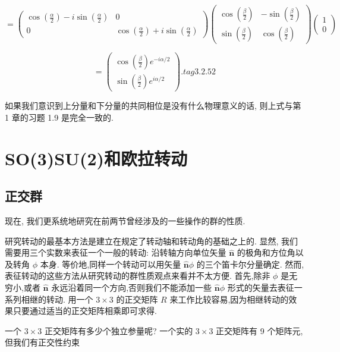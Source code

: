 $$
= \left( \begin{matrix} \cos \left( \frac{\alpha }{2}\right) - i\sin \left( \frac{\alpha }{2}\right) & 0 \\ 0 & \cos \left( \frac{\alpha }{2}\right) + i\sin \left( \frac{\alpha }{2}\right) \end{matrix}\right) \left( \begin{matrix} \cos \left( \frac{\beta }{2}\right) & - \sin \left( \frac{\beta }{2}\right) \\ \sin \left( \frac{\beta }{2}\right) & \cos \left( \frac{\beta }{2}\right) \end{matrix}\right) \left( \begin{array}{l} 1 \\ 0 \end{array}\right)
$$

$$
= \left( \begin{array}{l} \cos \left( \frac{\beta }{2}\right) {e}^{-{i\alpha }/2} \\ \sin \left( \frac{\beta }{2}\right) {e}^{{i\alpha }/2} \end{array}\right) . tag{3. 2.52}
$$

如果我们意识到上分量和下分量的共同相位是没有什么物理意义的话, 则上式与第 1 章的习题 1.9 是完全一致的.

\section{SO(3)SU(2)和欧拉转动}
\subsection{正交群}

现在, 我们更系统地研究在前两节曾经涉及的一些操作的群的性质.

研究转动的最基本方法是建立在规定了转动轴和转动角的基础之上的. 显然, 我们需要用三个实数来表征一个一般的转动: 沿转轴方向单位矢量 $\widehat{\mathbf{n}}$ 的极角和方位角以及转角 $\phi$ 本身. 等价地,同样一个转动可以用矢量 $\widehat{\mathbf{n}}\phi$ 的三个笛卡尔分量确定. 然而,表征转动的这些方法从研究转动的群性质观点来看并不太方便. 首先,除非 $\phi$ 是无穷小,或者 $\widehat{\mathbf{n}}$ 永远沿着同一个方向,否则我们不能添加一些 $\widehat{\mathbf{n}}\phi$ 形式的矢量去表征一系列相继的转动. 用一个 $3 \times 3$ 的正交矩阵 $R$ 来工作比较容易,因为相继转动的效果只要通过适当的正交矩阵相乘即可求得.

一个 $3 \times 3$ 正交矩阵有多少个独立参量呢? 一个实的 $3 \times 3$ 正交矩阵有 9 个矩阵元,但我们有正交性约束

